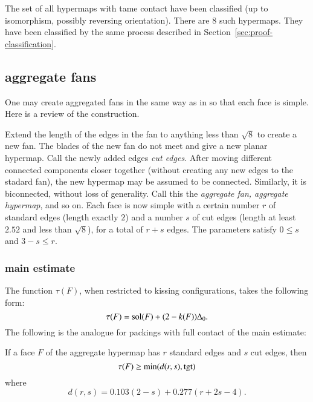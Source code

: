 The set of all hypermaps with tame contact have been classified (up to isomorphism, possibly reversing orientation).  There are $8$ such hypermaps.  They have been classified by the same process described in Section~\ref{sec:proof-classification}.
%
%
%


\subsection{aggregate fans}

One may create aggregated fans in the same way as in \cite{Hales:2006:DCG} so that each face is simple.  Here is a review of the construction.
%
%

Extend the length of the edges in the fan to anything less than  $\sqrt8$ to create a new fan.  The blades of the new fan do not meet and give a new planar hypermap.  Call the newly added edges {\it cut edges}.  After moving different connected components closer together (without creating any new edges to the stadard fan),  the new hypermap may be assumed to be connected.  Similarly, it is biconnected, without loss of generality.  Call this the {\it aggregate fan, aggregate hypermap}, and so on.   Each face is now simple with a certain number $r$ of standard edges (length exactly $2$) and a number $s$ of cut edges (length at least $2.52$ and less than $\sqrt8$), for a total of $r+s$ edges.  
The parameters satisfy $0\le s$ and $3-s \le r$.
%
%


\subsubsection{main estimate}

The function $\tau(F)$, when restricted to kissing configurations, takes the following form:
$$
\tau(F) = \operatorname{sol}(F) + (2-k(F)) \Delta_0.
$$
%
%
The following is the analogue for packings with full contact of the main estimate:

\begin{theorem}\label{lemma:main-estimate-12}  If a face $F$ of the aggregate hypermap has $r$ standard edges and $s$ cut edges, then 
$$\tau(F) \ge \min(d(r,s),{\operatorname{tgt}})$$
where 
$$
d(r,s) = 0.103 (2-s) + 0.277 (r+2s-4).
$$
\end{theorem}

